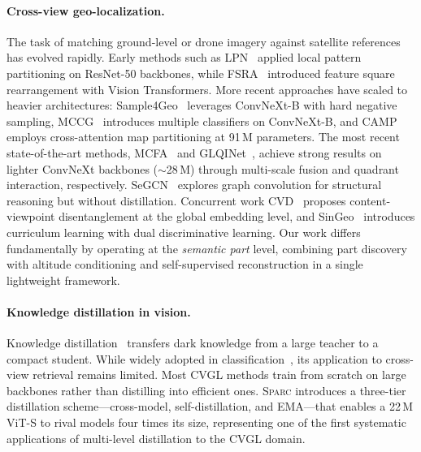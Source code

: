 \documentclass[sigconf, anonymous, review]{acmart}
\newcommand{\ours}{\textsc{Sparc}}
\begin{document}
\paragraph{Cross-view geo-localization.}
The task of matching ground-level or drone imagery against satellite references has evolved rapidly.
Early methods such as LPN~\cite{wang2022lpn} applied local pattern partitioning on ResNet-50 backbones, while FSRA~\cite{dai2021fsra} introduced feature square rearrangement with Vision Transformers.
More recent approaches have scaled to heavier architectures: Sample4Geo~\cite{deuser2023sample4geo} leverages ConvNeXt-B with hard negative sampling, MCCG~\cite{tian2024mccg} introduces multiple classifiers on ConvNeXt-B, and CAMP~\cite{yang2024camp} employs cross-attention map partitioning at 91\,M parameters.
The most recent state-of-the-art methods, MCFA~\cite{wang2025mcfa} and GLQINet~\cite{zhang2025glqinet}, achieve strong results on lighter ConvNeXt backbones (${\sim}$28\,M) through multi-scale fusion and quadrant interaction, respectively.
SeGCN~\cite{wang2023segcn} explores graph convolution for structural reasoning but without distillation.
Concurrent work CVD~\cite{wang2025cvd} proposes content-viewpoint disentanglement at the global embedding level, and SinGeo~\cite{chen2026singeo} introduces curriculum learning with dual discriminative learning.
Our work differs fundamentally by operating at the \emph{semantic part} level, combining part discovery with altitude conditioning and self-supervised reconstruction in a single lightweight framework.

\paragraph{Knowledge distillation in vision.}
Knowledge distillation~\cite{hinton2015distilling} transfers dark knowledge from a large teacher to a compact student.
While widely adopted in classification~\cite{gou2021knowledge}, its application to cross-view retrieval remains limited.
Most CVGL methods train from scratch on large backbones rather than distilling into efficient ones.
\ours{} introduces a three-tier distillation scheme---cross-model, self-distillation, and EMA---that enables a 22\,M ViT-S to rival models four times its size, representing one of the first systematic applications of multi-level distillation to the CVGL domain.
\end{document}
